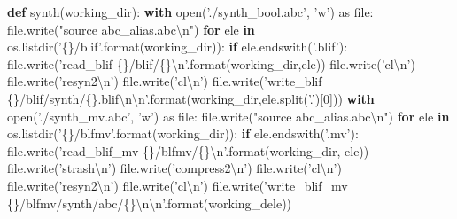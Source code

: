 \documentclass[italian,]{book}
\newenvironment{Shaded}{\begin{snugshade}}{\end{snugshade}}
\newcommand{\BuiltInTok}[1]{#1}
\newcommand{\CharTok}[1]{\textcolor[rgb]{0.31,0.60,0.02}{#1}}
\newcommand{\ControlFlowTok}[1]{\textcolor[rgb]{0.13,0.29,0.53}{\textbf{#1}}}
\newcommand{\DecValTok}[1]{\textcolor[rgb]{0.00,0.00,0.81}{#1}}
\newcommand{\ImportTok}[1]{#1}
\newcommand{\KeywordTok}[1]{\textcolor[rgb]{0.13,0.29,0.53}{\textbf{#1}}}
\newcommand{\NormalTok}[1]{#1}
\newcommand{\SpecialCharTok}[1]{\textcolor[rgb]{0.00,0.00,0.00}{#1}}
\newcommand{\StringTok}[1]{\textcolor[rgb]{0.31,0.60,0.02}{#1}}
\begin{document}
\begin{Shaded}
\begin{Highlighting}[]
\KeywordTok{def}\NormalTok{ synth(working_dir):  }
  \ControlFlowTok{with} \BuiltInTok{open}\NormalTok{(}\StringTok{'./synth_bool.abc'}\NormalTok{, }\StringTok{'w'}\NormalTok{) }\ImportTok{as} \BuiltInTok{file}\NormalTok{:}
    \BuiltInTok{file}\NormalTok{.write(}\StringTok{"source abc_alias.abc}\CharTok{\textbackslash{}n}\StringTok{"}\NormalTok{)}
    \ControlFlowTok{for}\NormalTok{ ele }\KeywordTok{in}\NormalTok{ os.listdir(}\StringTok{'}\SpecialCharTok{\{\}}\StringTok{/blif'}\NormalTok{.}\BuiltInTok{format}\NormalTok{(working_dir)):}
      \ControlFlowTok{if}\NormalTok{ ele.endswith(}\StringTok{'.blif'}\NormalTok{):}
        \BuiltInTok{file}\NormalTok{.write(}\StringTok{'read_blif }\SpecialCharTok{\{\}}\StringTok{/blif/}\SpecialCharTok{\{\}}\CharTok{\textbackslash{}n}\StringTok{'}\NormalTok{.}\BuiltInTok{format}\NormalTok{(working_dir,ele))}
        \BuiltInTok{file}\NormalTok{.write(}\StringTok{'cl}\CharTok{\textbackslash{}n}\StringTok{'}\NormalTok{)}
        \BuiltInTok{file}\NormalTok{.write(}\StringTok{'resyn2}\CharTok{\textbackslash{}n}\StringTok{'}\NormalTok{)}
        \BuiltInTok{file}\NormalTok{.write(}\StringTok{'cl}\CharTok{\textbackslash{}n}\StringTok{'}\NormalTok{)}
        \BuiltInTok{file}\NormalTok{.write(}\StringTok{'write_blif }\SpecialCharTok{\{\}}\StringTok{/blif/synth/}\SpecialCharTok{\{\}}\StringTok{.blif}\CharTok{\textbackslash{}n\textbackslash{}n}\StringTok{'}\NormalTok{.}\BuiltInTok{format}\NormalTok{(working_dir,ele.split(}\StringTok{'.'}\NormalTok{)[}\DecValTok{0}\NormalTok{]))}
  \ControlFlowTok{with} \BuiltInTok{open}\NormalTok{(}\StringTok{'./synth_mv.abc'}\NormalTok{, }\StringTok{'w'}\NormalTok{) }\ImportTok{as} \BuiltInTok{file}\NormalTok{:}
    \BuiltInTok{file}\NormalTok{.write(}\StringTok{"source abc_alias.abc}\CharTok{\textbackslash{}n}\StringTok{"}\NormalTok{)}
    \ControlFlowTok{for}\NormalTok{ ele }\KeywordTok{in}\NormalTok{ os.listdir(}\StringTok{'}\SpecialCharTok{\{\}}\StringTok{/blfmv'}\NormalTok{.}\BuiltInTok{format}\NormalTok{(working_dir)):}
      \ControlFlowTok{if}\NormalTok{ ele.endswith(}\StringTok{'.mv'}\NormalTok{):}
        \BuiltInTok{file}\NormalTok{.write(}\StringTok{'read_blif_mv }\SpecialCharTok{\{\}}\StringTok{/blfmv/}\SpecialCharTok{\{\}}\CharTok{\textbackslash{}n}\StringTok{'}\NormalTok{.}\BuiltInTok{format}\NormalTok{(working_dir, ele))}
        \BuiltInTok{file}\NormalTok{.write(}\StringTok{'strash}\CharTok{\textbackslash{}n}\StringTok{'}\NormalTok{)}
        \BuiltInTok{file}\NormalTok{.write(}\StringTok{'compress2}\CharTok{\textbackslash{}n}\StringTok{'}\NormalTok{)}
        \BuiltInTok{file}\NormalTok{.write(}\StringTok{'cl}\CharTok{\textbackslash{}n}\StringTok{'}\NormalTok{)}
        \BuiltInTok{file}\NormalTok{.write(}\StringTok{'resyn2}\CharTok{\textbackslash{}n}\StringTok{'}\NormalTok{)}
        \BuiltInTok{file}\NormalTok{.write(}\StringTok{'cl}\CharTok{\textbackslash{}n}\StringTok{'}\NormalTok{)}
        \BuiltInTok{file}\NormalTok{.write(}\StringTok{'write_blif_mv }\SpecialCharTok{\{\}}\StringTok{/blfmv/synth/abc/}\SpecialCharTok{\{\}}\CharTok{\textbackslash{}n\textbackslash{}n}\StringTok{'}\NormalTok{.}\BuiltInTok{format}\NormalTok{(working_dele))}
  

\end{Highlighting}
\end{Shaded}
\end{document}
